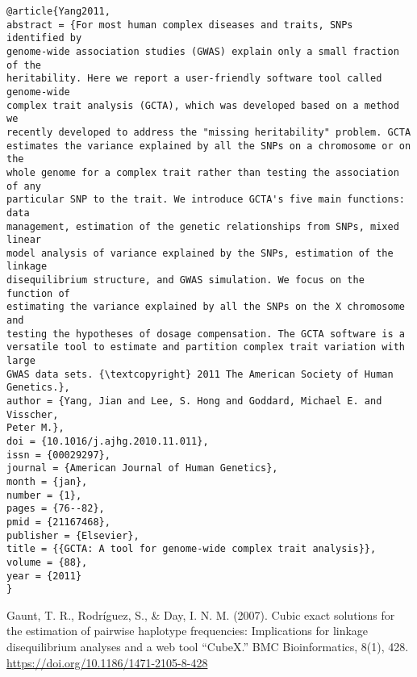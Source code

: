 \documentclass[]{article}
\begin{document}
\begin{verbatim}
@article{Yang2011,
abstract = {For most human complex diseases and traits, SNPs identified by
genome-wide association studies (GWAS) explain only a small fraction of the
heritability. Here we report a user-friendly software tool called genome-wide
complex trait analysis (GCTA), which was developed based on a method we
recently developed to address the "missing heritability" problem. GCTA
estimates the variance explained by all the SNPs on a chromosome or on the
whole genome for a complex trait rather than testing the association of any
particular SNP to the trait. We introduce GCTA's five main functions: data
management, estimation of the genetic relationships from SNPs, mixed linear
model analysis of variance explained by the SNPs, estimation of the linkage
disequilibrium structure, and GWAS simulation. We focus on the function of
estimating the variance explained by all the SNPs on the X chromosome and
testing the hypotheses of dosage compensation. The GCTA software is a
versatile tool to estimate and partition complex trait variation with large
GWAS data sets. {\textcopyright} 2011 The American Society of Human Genetics.},
author = {Yang, Jian and Lee, S. Hong and Goddard, Michael E. and Visscher,
Peter M.},
doi = {10.1016/j.ajhg.2010.11.011},
issn = {00029297},
journal = {American Journal of Human Genetics},
month = {jan},
number = {1},
pages = {76--82},
pmid = {21167468},
publisher = {Elsevier},
title = {{GCTA: A tool for genome-wide complex trait analysis}},
volume = {88},
year = {2011}
}
\end{verbatim}

Gaunt, T. R., Rodríguez, S., \& Day, I. N. M. (2007). Cubic exact solutions for the estimation of pairwise haplotype frequencies: Implications for linkage disequilibrium analyses and a web tool “CubeX.” BMC Bioinformatics, 8(1), 428. \url{https://doi.org/10.1186/1471-2105-8-428}
\end{document}
